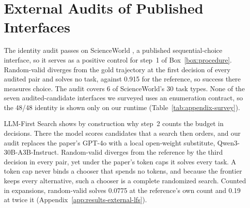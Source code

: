 \section{External Audits of Published Interfaces}
\label{app:results-external}
\label{sec:results-external}

The identity audit passes on ScienceWorld \citep{wang2022scienceworld}, a published sequential-choice interface, so it serves as a positive control for step~1 of Box~\ref{box:procedure}. Random-valid diverges from the gold trajectory at the first decision of every audited pair and solves no task, against 0.915 for the reference, so success there measures choice. The audit covers 6 of ScienceWorld's 30 task types. None of the seven audited-candidate interfaces we surveyed uses an enumeration contract, so the 48/48 identity is shown only on our runtime (Table~\ref{tab:appendix-survey}).

LLM-First Search \citep{herr2025llmfirst} shows by construction why step~2 counts the budget in decisions. There the model scores candidates that a search then orders, and our audit replaces the paper's GPT-4o with a local open-weight substitute, Qwen3-30B-A3B-Instruct. Random-valid diverges from the reference by the third decision in every pair, yet under the paper's token caps it solves every task. A token cap never binds a chooser that spends no tokens, and because the frontier keeps every alternative, such a chooser is a complete randomized search. Counted in expansions, random-valid solves 0.0775 at the reference's own count and 0.19 at twice it (Appendix~\ref{app:results-external-lfs}).

